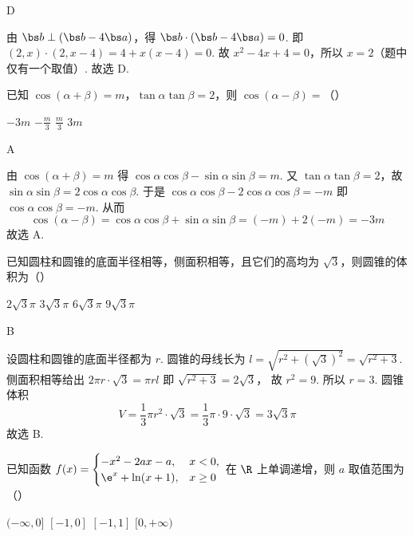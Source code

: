 \begin{answer}
D
\end{answer}

\begin{solution}
由 \(\bs b\perp (\bs b-4\bs a)\)，得
\(\bs b\cdot (\bs b-4\bs a)=0\).
即
\((2,x)\cdot\left(2,x-4\right)=4+x(x-4)=0\).
故 \(x^2-4x+4=0\)，所以 \(x=2\)（题中仅有一个取值）. 故选 D.
\end{solution}

\begin{problem}
已知 \(\cos(\alpha+\beta)=m\)，\(\tan\alpha\tan\beta=2\)，则 \(\cos(\alpha-\beta)=\)（\quad）

\choices
    {\(-3m\)}
    {\(-\frac{m}{3}\)}
    {\(\frac{m}{3}\)}
    {\(3m\)}
\end{problem}

\begin{answer}
A
\end{answer}

\begin{solution}
由 \(\cos(\alpha+\beta)=m\) 得
\(\cos\alpha\cos\beta-\sin\alpha\sin\beta=m\).
又 \(\tan\alpha\tan\beta=2\)，故
\(\sin\alpha\sin\beta=2\cos\alpha\cos\beta\).
于是
\(\cos\alpha\cos\beta-2\cos\alpha\cos\beta=-m\)
即 \(\cos\alpha\cos\beta=-m\). 从而
\[
\cos(\alpha-\beta)=\cos\alpha\cos\beta+\sin\alpha\sin\beta=(-m)+2(-m)=-3m
\]
故选 A.
\end{solution}

\begin{problem}
已知圆柱和圆锥的底面半径相等，侧面积相等，且它们的高均为 \(\sqrt3\)，则圆锥的体积为（\quad）

\choices
    {\(2\sqrt3\pi\)}
    {\(3\sqrt3\pi\)}
    {\(6\sqrt3\pi\)}
    {\(9\sqrt3\pi\)}
\end{problem}

\begin{answer}
B
\end{answer}

\begin{solution}
设圆柱和圆锥的底面半径都为 \(r\). 圆锥的母线长为
\(l=\sqrt{r^2+(\sqrt3)^2}=\sqrt{r^2+3}\).
侧面积相等给出
\(2\pi r\cdot \sqrt3=\pi rl\)
即
\(\sqrt{r^2+3}=2\sqrt3\)，
故
\(r^2=9\).
所以 \(r=3\). 圆锥体积
\[
V=\frac13\pi r^2\cdot \sqrt3=\frac13\pi\cdot 9\cdot \sqrt3=3\sqrt3\pi
\]
故选 B.
\end{solution}

\begin{problem}
已知函数
\(f(x)=\begin{cases}
-x^2-2ax-a, & x<0,\\
\e^x+\ln(x+1), & x\ge 0
\end{cases}\)
在 \(\R\) 上单调递增，则 \(a\) 取值范围为（\quad）

\choices
    {\((-\infty,0]\)}
    {\([-1,0]\)}
    {\([-1,1]\)}
    {\([0,+\infty)\)}
\end{problem}

